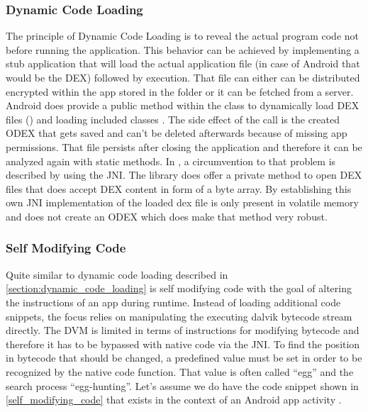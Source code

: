 \subsubsection{Dynamic Code Loading}\label{section:dynamic_code_loading}
The principle of Dynamic Code Loading is to reveal the actual program code
not before running the application. This behavior can be achieved by
implementing a stub application that will load the actual application file
(in case of Android that would be the DEX) followed by execution.
That file can either can be distributed encrypted within the app stored
in the  folder or it can be fetched from a server.
Android does provide a public method within
the  class to dynamically load DEX files
()
and loading included classes \parencite{dexfileclass}. The side effect
of the  call is the created ODEX that gets saved and
can't be deleted afterwards because of missing app permissions.
That file persists after closing the application and therefore
it can be analyzed again with static methods. In \parencite{code_protection},
a circumvention to that problem is described by using the JNI.
The  library does offer a private method to open DEX files
that does accept DEX content in form of a byte array.
By establishing this own JNI implementation of
 the loaded dex file is only present
in volatile memory and does not create an ODEX \parencite{code_protection}
which does make that method very robust.

\subsubsection{Self Modifying Code}
Quite similar to dynamic code loading described in
\autoref{section:dynamic_code_loading} is self modifying code with the goal
of altering the instructions of an app during runtime.
Instead of loading additional code snippets, the focus relies on
manipulating the executing dalvik bytecode stream directly.
The DVM is limited in terms of instructions for modifying bytecode
and therefore it has to be bypassed with native code via the JNI.
To find the position in bytecode that should be changed, a predefined
value must be set in order to be recognized by the native code function.
That value is often called ``egg'' and the search process ``egg-hunting''.
Let's assume we do have the code snippet shown in \autoref{self_modifying_code} that exists in the context of an Android app activity
\parencite{code_protection}.

